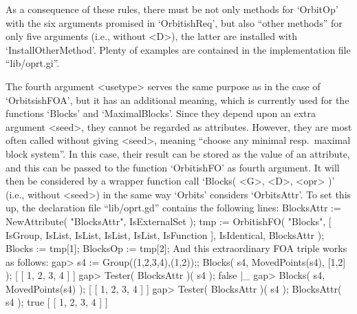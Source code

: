 As a  consequence of  these rules, there  must be  not  only methods  for
`OrbitOp' with  the six arguments  promised  in `OrbitishReq',  but  also
``other methods'' for only five arguments (i.e., without <D>), the latter
are installed with `InstallOtherMethod'. Plenty of examples are contained
in the implementation file ``lib/oprt.gi''.

The fourth argument <usetype> serves the  same purpose as  in the case of
`OrbitsishFOA', but it has an additional meaning, which is currently used
for the functions `Blocks' and `MaximalBlocks'. Since they depend upon an
extra argument  <seed>, they cannot be  regarded as  attributes. However,
they are  most often called without  giving  <seed>, meaning ``choose any
minimal resp.\ maximal block system''. In this case,  their result can be
stored   as the value of an   attribute, and this can    be passed to the
function `OrbitishFO' as fourth argument. It will then be considered by a
wrapper function call `Blocks( <G>, <D>, <opr>  )' (i.e., without <seed>)
in the  same  way `Orbits' considers  `OrbitsAttr'. To  set  this up, the
declaration file ``lib/oprt.gd'' contains the following lines:
\begintt
    BlocksAttr := NewAttribute( "BlocksAttr", IsExternalSet );
    tmp := OrbitishFO( "Blocks",
	[ IsGroup, IsList, IsList,
	  IsList,
	  IsList,
	  IsFunction ], IsIdentical, BlocksAttr );
    Blocks   := tmp[1];
    BlocksOp := tmp[2];
\endtt
And this extraordinary FOA triple works as follows:
\beginexample
    gap> s4 := Group((1,2,3,4),(1,2));; Blocks( s4, MovedPoints(s4), [1,2] );
    [ [ 1, 2, 3, 4 ] ]
    gap> Tester( BlocksAttr )( s4 );
    false
|_
    gap> Blocks( s4, MovedPoints(s4) );       
    [ [ 1, 2, 3, 4 ] ]
    gap> Tester( BlocksAttr )( s4 );  BlocksAttr( s4 );
    true
    [ [ 1, 2, 3, 4 ] ]
\endexample

